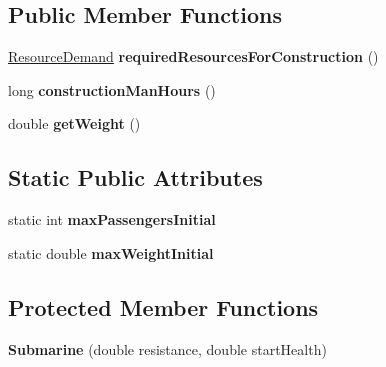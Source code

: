 \subsection*{Public Member Functions}
\begin{DoxyCompactItemize}
\item 
\hyperlink{classuniverse_1_1_resource_demand}{Resource\+Demand} {\bfseries required\+Resources\+For\+Construction} ()\hypertarget{classtools_1_1vehicles_1_1sea_1_1_submarine_a30737f3376e6365ef92dc7354a483e47}{}\label{classtools_1_1vehicles_1_1sea_1_1_submarine_a30737f3376e6365ef92dc7354a483e47}

\item 
long {\bfseries construction\+Man\+Hours} ()\hypertarget{classtools_1_1vehicles_1_1sea_1_1_submarine_a842b344098540943b95bcdd4e7520f96}{}\label{classtools_1_1vehicles_1_1sea_1_1_submarine_a842b344098540943b95bcdd4e7520f96}

\item 
double {\bfseries get\+Weight} ()\hypertarget{classtools_1_1vehicles_1_1sea_1_1_submarine_a91f064430a00d45e581c4a394947b9a8}{}\label{classtools_1_1vehicles_1_1sea_1_1_submarine_a91f064430a00d45e581c4a394947b9a8}

\end{DoxyCompactItemize}
\subsection*{Static Public Attributes}
\begin{DoxyCompactItemize}
\item 
static int {\bfseries max\+Passengers\+Initial}\hypertarget{classtools_1_1vehicles_1_1sea_1_1_submarine_ad48731efa58aae12127f5f3b8a0cd7d3}{}\label{classtools_1_1vehicles_1_1sea_1_1_submarine_ad48731efa58aae12127f5f3b8a0cd7d3}

\item 
static double {\bfseries max\+Weight\+Initial}\hypertarget{classtools_1_1vehicles_1_1sea_1_1_submarine_a626e3ed5a5f81a08a0d4e6d13a6decf9}{}\label{classtools_1_1vehicles_1_1sea_1_1_submarine_a626e3ed5a5f81a08a0d4e6d13a6decf9}

\end{DoxyCompactItemize}
\subsection*{Protected Member Functions}
\begin{DoxyCompactItemize}
\item 
{\bfseries Submarine} (double resistance, double start\+Health)\hypertarget{classtools_1_1vehicles_1_1sea_1_1_submarine_a2ada4ff319cc9280f98608191581852a}{}\label{classtools_1_1vehicles_1_1sea_1_1_submarine_a2ada4ff319cc9280f98608191581852a}

\end{DoxyCompactItemize}

